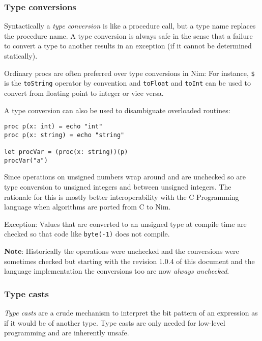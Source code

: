\hypertarget{type-conversions}{%
\subsubsection{Type conversions}\label{type-conversions}}

Syntactically a \emph{type conversion} is like a procedure call, but a
type name replaces the procedure name. A type conversion is always safe
in the sense that a failure to convert a type to another results in an
exception (if it cannot be determined statically).

Ordinary procs are often preferred over type conversions in Nim: For
instance, \texttt{\$} is the \texttt{toString} operator by convention
and \texttt{toFloat} and \texttt{toInt} can be used to convert from
floating point to integer or vice versa.

A type conversion can also be used to disambiguate overloaded routines:

\begin{verbatim}
proc p(x: int) = echo "int"
proc p(x: string) = echo "string"

let procVar = (proc(x: string))(p)
procVar("a")
\end{verbatim}

Since operations on unsigned numbers wrap around and are unchecked so
are type conversion to unsigned integers and between unsigned integers.
The rationale for this is mostly better interoperability with the C
Programming language when algorithms are ported from C to Nim.

Exception: Values that are converted to an unsigned type at compile time
are checked so that code like \texttt{byte(-1)} does not compile.

\textbf{Note}: Historically the operations were unchecked and the
conversions were sometimes checked but starting with the revision 1.0.4
of this document and the language implementation the conversions too are
now \emph{always unchecked}.

\hypertarget{type-casts}{%
\subsubsection{Type casts}\label{type-casts}}

\emph{Type casts} are a crude mechanism to interpret the bit pattern of
an expression as if it would be of another type. Type casts are only
needed for low-level programming and are inherently unsafe.

\begin{verbatim}
\end{verbatim}

